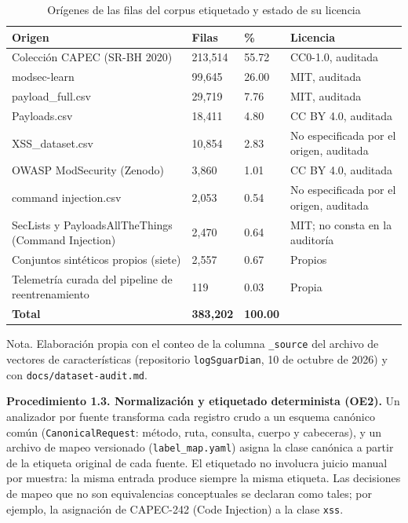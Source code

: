 \begin{table}[H]
\centering
\small
\begin{tabular}{|L{4.3cm}|L{1.8cm}|L{1.3cm}|L{5.3cm}|}
\hline
\textbf{Origen} & \textbf{Filas} & \textbf{\%} & \textbf{Licencia} \\ \hline
Colección CAPEC (SR-BH 2020) \cite{sureda2022srbh,sureda2022newmultilabel} & 213{,}514 & 55.72 & CC0-1.0, auditada \\ \hline
modsec-learn \cite{pralab2024modseclearn,scano2024modseclearn} & 99{,}645 & 26.00 & MIT, auditada \\ \hline
payload\_full.csv \cite{thakur2025payloads} & 29{,}719 & 7.76 & MIT, auditada \\ \hline
Payloads.csv \cite{shahane2021xss} & 18{,}411 & 4.80 & CC BY 4.0, auditada \\ \hline
XSS\_dataset.csv \cite{shah2020xss} & 10{,}854 & 2.83 & No especificada por el origen, auditada \\ \hline
OWASP ModSecurity (Zenodo) \cite{lucz2025} & 3{,}860 & 1.01 & CC BY 4.0, auditada \\ \hline
command injection.csv \cite{pawase2024cmdi} & 2{,}053 & 0.54 & No especificada por el origen, auditada \\ \hline
SecLists y PayloadsAllTheThings \cite{miessler2026seclists,swisskyrepo2026payloads} (Command Injection) & 2{,}470 & 0.64 & MIT; no consta en la auditoría \\ \hline
Conjuntos sintéticos propios (siete) & 2{,}557 & 0.67 & Propios \\ \hline
Telemetría curada del pipeline de reentrenamiento & 119 & 0.03 & Propia \\ \hline
\textbf{Total} & \textbf{383{,}202} & \textbf{100.00} & \\ \hline
\end{tabular}
\caption[Orígenes de las filas del corpus]{Orígenes de las filas del corpus etiquetado y estado de su licencia}
\label{tab:met-origenes}
\end{table}
{\footnotesize Nota. Elaboración propia con el conteo de la columna \texttt{\_source} del archivo de
vectores de características (repositorio \texttt{logSguarDian}, 10 de octubre de 2026) y con
\texttt{docs/dataset-audit.md}.}

\textbf{Procedimiento 1.3. Normalización y etiquetado determinista (OE2).} Un analizador por
fuente transforma cada registro crudo a un esquema canónico común (\texttt{CanonicalRequest}:
método, ruta, consulta, cuerpo y cabeceras), y un archivo de mapeo versionado
(\texttt{label\_map.yaml}) asigna la clase canónica a partir de la etiqueta original de cada
fuente. El etiquetado no involucra juicio manual por muestra: la misma entrada produce siempre la
misma etiqueta. Las decisiones de mapeo que no son equivalencias conceptuales se declaran como
tales; por ejemplo, la asignación de CAPEC-242 (Code Injection) a la clase \texttt{xss}.

